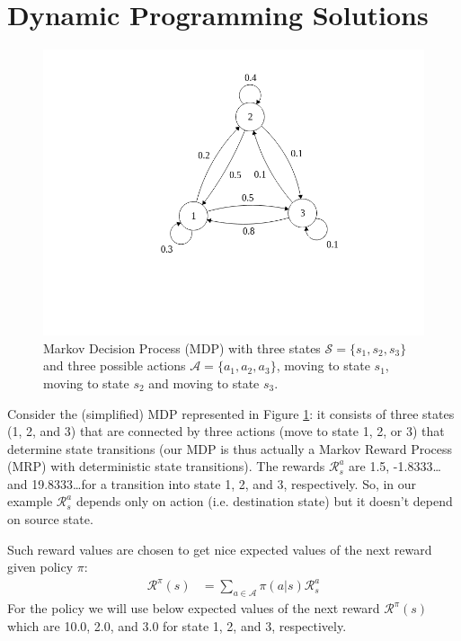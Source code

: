     
\section{Dynamic Programming Solutions}

\begin{figure}[!ht]
\centering
\includegraphics[scale=0.5,trim={0 5cm 0 1cm},clip]{figs/reinforcement_learning/mdp.png}
\caption{Markov Decision Process (MDP) with three states $\mathcal{S}=\{s_1,s_2,s_3\}$ and three possible actions $\mathcal{A}=\{a_1,a_2,a_3\}$, moving to state $s_1$, moving to state $s_2$ and moving to state $s_3$.}
\label{fig:MDP}
\end{figure}

Consider the (simplified) MDP represented in Figure \ref{fig:MDP}: it consists of three states (1, 2, and 3) that are connected by three actions (move to state 1, 2, or 3) that determine state transitions (our MDP is thus actually a Markov Reward Process (MRP) with deterministic state transitions). The rewards $\mathcal{R}_s^a$ are 1.5, -1.8333\dots and 19.8333\dots for a transition into state 1, 2, and 3, respectively. So, in our example $\mathcal{R}_s^a$ depends only on action (i.e. destination state) but it doesn't depend on source state.

Such reward values are chosen to get nice expected values of the next reward given policy $\pi$:
\begin{align*}
    {\mathcal{R}}^{\pi}(s) & = \sum_{a \in \mathcal{A}} \pi(a|s) \mathcal{R}_s^a
\end{align*}
For the policy we will use below expected values of the next reward ${\mathcal{R}}^{\pi}(s)$ which are 10.0, 2.0, and 3.0 for state 1, 2, and 3, respectively.

